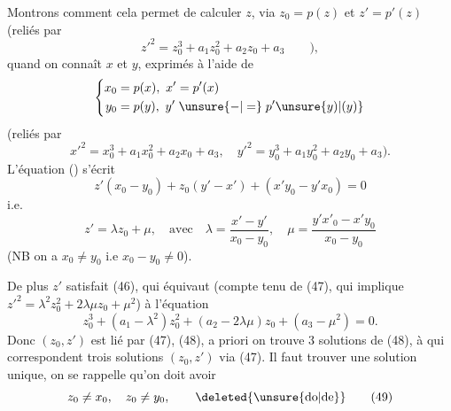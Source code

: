 Montrons comment cela permet de calculer $z$, via $z_0=p(z)$ et $z'=p'(z)$ (reliés par
\[
 {z'}^2=z_0^3+a_1z_0^2+a_2z_0+a_3\qquad), \tag*{(46)}
\]
quand on connaît $x$ et $y$, exprimés à l'aide de 
\[
 \left\{\begin{aligned}
 x_0&=p(x),\ x'=p'(x)\\
 y_0&=p(y),\ y'\mathrel{\unsure{-|=}}p'\unsure{y)|(y)}
 \end{aligned}\right.
\]
(reliés par
\[
 {x'}^2=x_0^3+a_1x_0^2+a_2x_0+a_3,\quad
 {y'}^2=y_0^3+a_1y_0^2+a_2y_0+a_3).
\]
L'équation () s'écrit
\[
 z'(x_0-y_0)+z_0(y'-x')+(x'y_0-y'x_0)=0 \tag*{$(*)$}
\]
i.e.
\[
 z'=\lambda z_0+\mu,\quad\text{avec}\quad
 \lambda=\frac{x'-y'}{x_0-y_0},\quad
 \mu=\frac{y'x'_0-x'y_0}{x_0-y_0} \tag*{(47)}
\]
 (NB on a $x_0\ne y_0$ i.e $x_0-y_0\ne0$).

De plus $z'$ satisfait (46), qui équivaut   (compte tenu de (47), qui implique $ {z'}^2=\lambda^2z_0^2+2\lambda\mu z_0+\mu^2$) à l'équation
\[
 z_0^3+(a_1-\lambda^2)z_0^2+(a_2-2\lambda\mu)z_0+(a_3-\mu^2)=0. \tag*{(48)}
\]
Donc $(z_0,z')$ est lié par (47), (48), a priori on trouve 3 solutions  de (48), à qui correspondent trois solutions $(z_0,z')$ via (47). Il faut trouver une solution unique, on se rappelle qu'on doit avoir
\[
 z_0\ne x_0,\quad z_0\ne y_0,\qquad\deleted{\text{\unsure{do|de}}} \tag*{(49)}
\]
